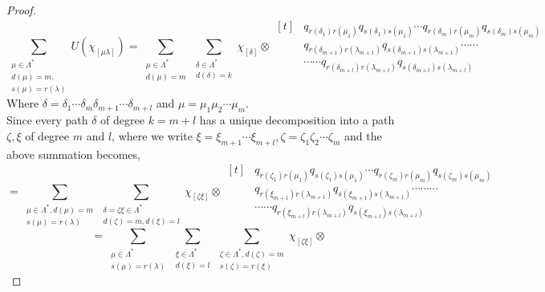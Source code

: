 \documentclass{amsart}
\theoremstyle{plain}
\theoremstyle{definition}
\theoremstyle{remark}
\numberwithin{equation}{section}
\begin{document}
\begin{proof}
\begin{equation*}
    \sum\limits_{\substack{\mu\in \Lambda^{\ast}\\ d(\mu)=m, \\s(\mu)=r(\lambda)}}U(\chi_{[\mu\lambda]}) =\sum\limits_{\substack{\mu\in \Lambda^{\ast} \\ d(\mu)=m}}\sum\limits_{\substack{\delta\in \Lambda^{\ast} \\ d(\delta)=k}}\chi_{[\delta]}\otimes
    \begin{aligned}[t]
        &q_{r(\delta_{1})r(\mu_{1})}q_{s(\delta_{1})s(\mu_{1})}\cdots q_{r(\delta_{m})r(\mu_{m})}q_{s(\delta_{m})s(\mu_{m})} \\
        &q_{r(\delta_{m+1})r(\lambda_{m+1})}q_{s(\delta_{m+1})s(\lambda_{m+1})}\cdots\cdots \\
        &\cdots\cdots
q_{r(\delta_{m+l})r(\lambda_{m+l})}q_{s(\delta_{m+l})s(\lambda_{m+l})}
    \end{aligned}
\end{equation*}
Where $\delta=\delta_{1}\cdots\delta_{m}\delta_{m+1}\cdots\delta_{m+l}$ and $\mu=\mu_{1}\mu_{2}\cdots\mu_{m}$.\\
Since every path $\delta$ of degree $k=m+l$ has a unique decomposition into a path $\zeta,\xi$ of degree $m$ and $l$, where we write $\xi=\xi_{m+1}\cdots\xi_{m+l},\zeta=\zeta_{1}\zeta_{2}\cdots\zeta_{m}$ and the above summation becomes,
\begin{equation*}
    =\sum\limits_{\substack{\mu\in \Lambda^{\ast}, d(\mu)=m \\ s(\mu)=r(\lambda)}} \sum\limits_{\substack{\delta=\zeta\xi\in \Lambda^{\ast} \\ d(\zeta)=m, d(\xi)=l}}\chi_{[\zeta\xi]}\otimes 
    \begin{aligned}[t]
        &q_{r(\zeta_{1})r(\mu_{1})}q_{s(\zeta_{1})s(\mu_{1})}\cdots q_{r(\zeta_{m})r(\mu_{m})}q_{s(\zeta_{m})s(\mu_{m})} \\
        &q_{r(\xi_{m+1})r(\lambda_{m+1})}q_{s(\xi_{m+1})s(\lambda_{m+1})}\cdots\cdots\cdots \\
        &\cdots\cdots q_{r(\xi_{m+l})r(\lambda_{m+l})}q_{s(\xi_{m+l})s(\lambda_{m+l})}
    \end{aligned}
\end{equation*}
\begin{equation*}
    =\sum\limits_{\substack{\mu\in \Lambda^{\ast} \\ s(\mu)=r(\lambda)}} \sum\limits_{\substack{\xi\in \Lambda^{\ast}\\ d(\xi)=l }}\sum\limits_{\substack{\zeta\in \Lambda^{\ast}, d(\zeta)=m \\ s(\zeta)=r(\xi)}} \chi_{[\zeta\xi]}\otimes

\end{equation*}
\end{proof}
\end{document}
